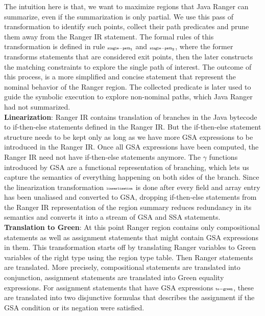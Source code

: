 %
The intuition here is that, we want to maximize regions that Java Ranger can summarize, even if the summarization is
only partial.
%
We use this pass of transformation to identify such points, collect their path predicates and prune them away from the
Ranger IR statement. The formal rules of this transformation is defined in rule $\scriptscriptstyle\mathtt{single-path_1}$ and $\scriptscriptstyle\mathtt{single-path_2}$, where the former transforms statements that are considered exit points, then the later constructs the matching constraints to explore the single path of interest. 
%
The outcome of this process, is a more simplified and concise statement that represent the nominal behavior of the Ranger region.
%
The collected predicate is later used to guide the symbolic execution to explore non-nominal paths, which Java Ranger
had not summarized.  \\
%
\textbf{Linearization}:
Ranger IR contains translation of branches in the Java bytecode to if-then-else statements defined in the Ranger IR.
%
But the if-then-else statement structure needs to be kept only as long as we have more GSA expressions to be
introduced in the Ranger IR.
%
Once all GSA expressions have been computed, the Ranger IR need not have if-then-else statements anymore.
%
The $\gamma$ functions introduced by GSA are a functional representation of branching, which lets us
capture the semantics of everything happening on both sides of the branch.
%
Since the linearization transformation $\scriptscriptstyle\mathtt{linearlization}$ is done after every field and array entry has been unaliased and converted to
GSA, dropping if-then-else statements from the Ranger IR representation of the region summary reduces redundancy in its
semantics and converts it into a stream of GSA and SSA statements.\\
\textbf{Translation to Green}:
%
At this point Ranger region contains only compositional statements as well as assignment statements that might contain GSA expressions in them.
%
This transformation starts off by translating Ranger variables to Green variables of the right type using the region type table.
%
Then Ranger statements are translated. More precisely, compositional statements are translated into conjunction, assignment statements are translated into Green equality expressions.
%
For assignment statements that have GSA expressions $\scriptscriptstyle\mathtt{to-green}$, these are translated into two disjunctive formulas that describes the assignment if the GSA condition or its negation were satisfied. 

